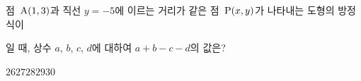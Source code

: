 점~$\mathrm{A}(1{,}\mkern3mu\mathopen{}3)$과 직선 $y=-5$에 이르는 거리가 같은 점~$\mathrm{P}(x{,}\mkern3mu\mathopen{}y)$가 나타내는 도형의 방정식이 \par\smallskip{}\par\smallskip\noindent 일 때, 상수 $a$, $b$, $c$, $d$에 대하여 $a+b-c-d$의 값은?
\begin{choices32}{$26$}{$27$}{$28$}{$29$}{$30$}\end{choices32}
